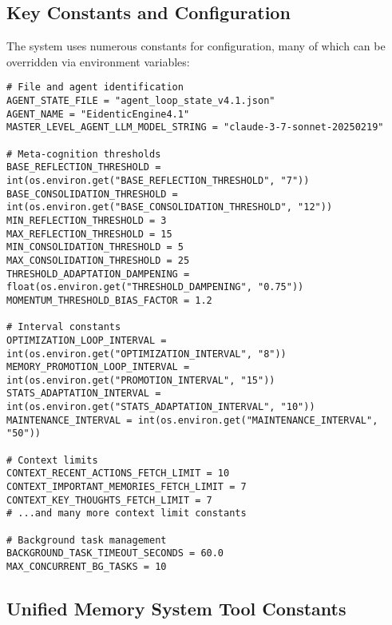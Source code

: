 \documentclass[12pt,a4paper]{article}
\begin{document}
\subsection*{Key Constants and Configuration}

The system uses numerous constants for configuration, many of which can be overridden via environment variables:
\begin{pageablecode}
\begin{verbatim}
# File and agent identification
AGENT_STATE_FILE = "agent_loop_state_v4.1.json"
AGENT_NAME = "EidenticEngine4.1"
MASTER_LEVEL_AGENT_LLM_MODEL_STRING = "claude-3-7-sonnet-20250219"

# Meta-cognition thresholds
BASE_REFLECTION_THRESHOLD = int(os.environ.get("BASE_REFLECTION_THRESHOLD", "7"))
BASE_CONSOLIDATION_THRESHOLD = int(os.environ.get("BASE_CONSOLIDATION_THRESHOLD", "12"))
MIN_REFLECTION_THRESHOLD = 3
MAX_REFLECTION_THRESHOLD = 15
MIN_CONSOLIDATION_THRESHOLD = 5
MAX_CONSOLIDATION_THRESHOLD = 25
THRESHOLD_ADAPTATION_DAMPENING = float(os.environ.get("THRESHOLD_DAMPENING", "0.75"))
MOMENTUM_THRESHOLD_BIAS_FACTOR = 1.2

# Interval constants
OPTIMIZATION_LOOP_INTERVAL = int(os.environ.get("OPTIMIZATION_INTERVAL", "8"))
MEMORY_PROMOTION_LOOP_INTERVAL = int(os.environ.get("PROMOTION_INTERVAL", "15"))
STATS_ADAPTATION_INTERVAL = int(os.environ.get("STATS_ADAPTATION_INTERVAL", "10"))
MAINTENANCE_INTERVAL = int(os.environ.get("MAINTENANCE_INTERVAL", "50"))

# Context limits
CONTEXT_RECENT_ACTIONS_FETCH_LIMIT = 10
CONTEXT_IMPORTANT_MEMORIES_FETCH_LIMIT = 7
CONTEXT_KEY_THOUGHTS_FETCH_LIMIT = 7
# ...and many more context limit constants

# Background task management
BACKGROUND_TASK_TIMEOUT_SECONDS = 60.0
MAX_CONCURRENT_BG_TASKS = 10
\end{verbatim}
\end{pageablecode}

\subsection*{Unified Memory System Tool Constants}
\end{document}
